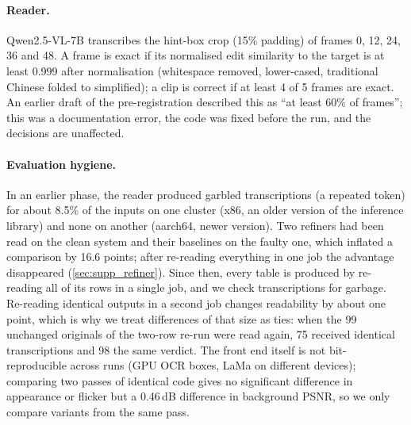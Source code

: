 \paragraph{Reader.} Qwen2.5-VL-7B transcribes the hint-box crop (15\% padding) of frames 0, 12, 24, 36 and 48. A frame is exact if its normalised edit similarity to the target is at least 0.999 after normalisation (whitespace removed, lower-cased, traditional Chinese folded to simplified); a clip is correct if at least 4 of 5 frames are exact. An earlier draft of the pre-registration described this as ``at least 60\% of frames''; this was a documentation error, the code was fixed before the run, and the decisions are unaffected.

\paragraph{Evaluation hygiene.} In an earlier phase, the reader produced garbled transcriptions (a repeated token) for about 8.5\% of the inputs on one cluster (x86, an older version of the inference library) and none on another (aarch64, newer version). Two refiners had been read on the clean system and their baselines on the faulty one, which inflated a comparison by 16.6 points; after re-reading everything in one job the advantage disappeared (\cref{sec:supp_refiner}). Since then, every table is produced by re-reading all of its rows in a single job, and we check transcriptions for garbage. Re-reading identical outputs in a second job changes readability by about one point, which is why we treat differences of that size as ties: when the 99 unchanged originals of the two-row re-run were read again, 75 received identical transcriptions and 98 the same verdict. The front end itself is not bit-reproducible across runs (GPU OCR boxes, LaMa on different devices); comparing two passes of identical code gives no significant difference in appearance or flicker but a 0.46\,dB difference in background PSNR, so we only compare variants from the same pass.

